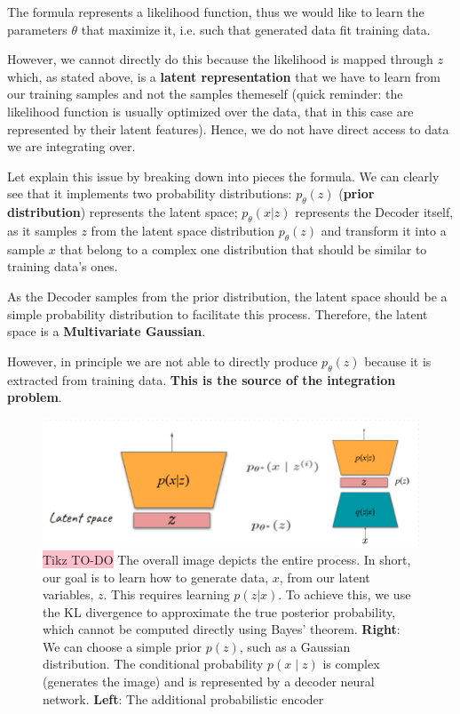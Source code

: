 The formula represents a likelihood function, thus we would like to learn the parameters $\theta$ that maximize it, i.e. such that generated data fit training data.

However, we cannot  directly do this because the likelihood is mapped through $z$ which, as stated above, is a \textbf{latent representation} that we have to learn from our training samples and not the samples themeself (quick reminder: the likelihood function is usually optimized over the data, that in this case are represented by their latent features). Hence, we do not have direct access to data we are integrating over.


Let explain this issue by breaking down into pieces the formula. We can clearly see that it implements two probability distributions: $p_{\theta}(z)$ (\textbf{prior distribution}) represents the latent space; $p_{\theta}(x|z)$ represents the Decoder itself, as it samples $z$ from the latent space distribution $p_{\theta}(z)$ and transform it into a sample $x$ that belong to a complex one distribution that should be similar to training data's ones.


As the Decoder samples from the prior distribution, the latent space should be a simple probability distribution to facilitate this process. Therefore, the latent space is a \textbf{Multivariate Gaussian}.


However, in principle we are not able to directly produce $p_{\theta}(z)$ because it is extracted from training data. \textbf{This is the source of the integration problem}.

\begin{figure}[!htbp]
    \centering
    \includegraphics[width=\linewidth]{tikz/VAE posterior.png}
    \caption{{\color{red}\colorbox{pink}{Tikz TO-DO}} The overall image depicts the entire process. In short, our goal is to learn how to generate data, $x$, from our latent variables, $z$. This requires learning $p(z \text{|} x)$. To achieve this, we use the KL divergence to approximate the true posterior probability, which cannot be computed directly using Bayes' theorem. \textbf{Right}: We can choose a simple prior $p(z)$, such as a Gaussian distribution. The conditional probability $p(x∣z)$ is complex (generates the image) and is represented by a decoder neural network. \textbf{Left}: The additional probabilistic encoder}
    \label{fig:VAE-posterior}
\end{figure}

